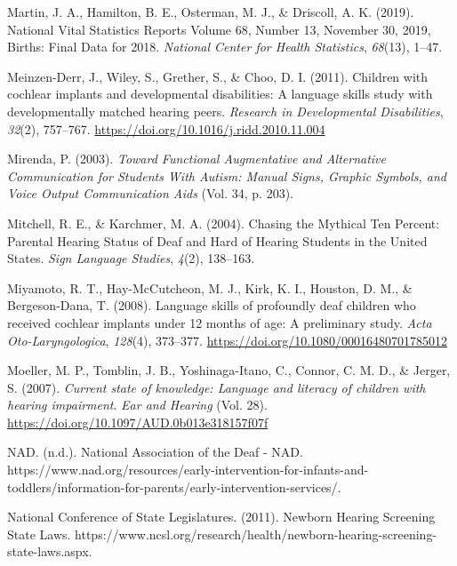 \documentclass[english,man]{apa6}
\begin{document}
\leavevmode\hypertarget{ref-martin2019}{}%
Martin, J. A., Hamilton, B. E., Osterman, M. J., \& Driscoll, A. K. (2019). National Vital Statistics Reports Volume 68, Number 13, November 30, 2019, Births: Final Data for 2018. \emph{National Center for Health Statistics}, \emph{68}(13), 1--47.

\leavevmode\hypertarget{ref-meinzen-derr2011}{}%
Meinzen-Derr, J., Wiley, S., Grether, S., \& Choo, D. I. (2011). Children with cochlear implants and developmental disabilities: A language skills study with developmentally matched hearing peers. \emph{Research in Developmental Disabilities}, \emph{32}(2), 757--767. \url{https://doi.org/10.1016/j.ridd.2010.11.004}

\leavevmode\hypertarget{ref-mirenda2003}{}%
Mirenda, P. (2003). \emph{Toward Functional Augmentative and Alternative Communication for Students With Autism: Manual Signs, Graphic Symbols, and Voice Output Communication Aids} (Vol. 34, p. 203).

\leavevmode\hypertarget{ref-mitchell2004}{}%
Mitchell, R. E., \& Karchmer, M. A. (2004). Chasing the Mythical Ten Percent: Parental Hearing Status of Deaf and Hard of Hearing Students in the United States. \emph{Sign Language Studies}, \emph{4}(2), 138--163.

\leavevmode\hypertarget{ref-miyamoto2008}{}%
Miyamoto, R. T., Hay-McCutcheon, M. J., Kirk, K. I., Houston, D. M., \& Bergeson-Dana, T. (2008). Language skills of profoundly deaf children who received cochlear implants under 12 months of age: A preliminary study. \emph{Acta Oto-Laryngologica}, \emph{128}(4), 373--377. \url{https://doi.org/10.1080/00016480701785012}

\leavevmode\hypertarget{ref-moeller2007}{}%
Moeller, M. P., Tomblin, J. B., Yoshinaga-Itano, C., Connor, C. M. D., \& Jerger, S. (2007). \emph{Current state of knowledge: Language and literacy of children with hearing impairment}. \emph{Ear and Hearing} (Vol. 28). \url{https://doi.org/10.1097/AUD.0b013e318157f07f}

\leavevmode\hypertarget{ref-nad}{}%
NAD. (n.d.). National Association of the Deaf - NAD. https://www.nad.org/resources/early-intervention-for-infants-and-toddlers/information-for-parents/early-intervention-services/.

\leavevmode\hypertarget{ref-nationalconferenceofstatelegislatures2011}{}%
National Conference of State Legislatures. (2011). Newborn Hearing Screening State Laws. https://www.ncsl.org/research/health/newborn-hearing-screening-state-laws.aspx.
\end{document}
